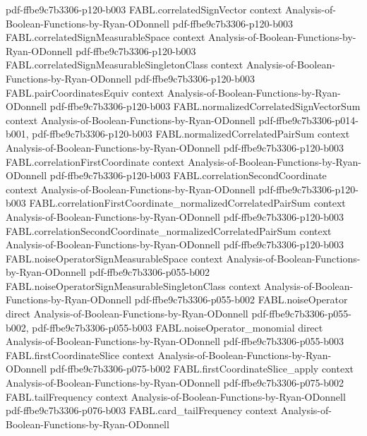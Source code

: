 \begin{theorem}
  {pdf-ffbe9c7b3306-p120-b003}
\proofstep
  {FABL.correlatedSignVector}
  {context}
  {Analysis-of-Boolean-Functions-by-Ryan-ODonnell}
  {pdf-ffbe9c7b3306-p120-b003}
\proofstep
  {FABL.correlatedSignMeasurableSpace}
  {context}
  {Analysis-of-Boolean-Functions-by-Ryan-ODonnell}
  {pdf-ffbe9c7b3306-p120-b003}
\proofstep
  {FABL.correlatedSignMeasurableSingletonClass}
  {context}
  {Analysis-of-Boolean-Functions-by-Ryan-ODonnell}
  {pdf-ffbe9c7b3306-p120-b003}
\proofstep
  {FABL.pairCoordinatesEquiv}
  {context}
  {Analysis-of-Boolean-Functions-by-Ryan-ODonnell}
  {pdf-ffbe9c7b3306-p120-b003}
\proofstep
  {FABL.normalizedCorrelatedSignVectorSum}
  {context}
  {Analysis-of-Boolean-Functions-by-Ryan-ODonnell}
  {pdf-ffbe9c7b3306-p014-b001,
    pdf-ffbe9c7b3306-p120-b003}
\proofstep
  {FABL.normalizedCorrelatedPairSum}
  {context}
  {Analysis-of-Boolean-Functions-by-Ryan-ODonnell}
  {pdf-ffbe9c7b3306-p120-b003}
\proofstep
  {FABL.correlationFirstCoordinate}
  {context}
  {Analysis-of-Boolean-Functions-by-Ryan-ODonnell}
  {pdf-ffbe9c7b3306-p120-b003}
\proofstep
  {FABL.correlationSecondCoordinate}
  {context}
  {Analysis-of-Boolean-Functions-by-Ryan-ODonnell}
  {pdf-ffbe9c7b3306-p120-b003}
\proofstep
  {FABL.correlationFirstCoordinate_normalizedCorrelatedPairSum}
  {context}
  {Analysis-of-Boolean-Functions-by-Ryan-ODonnell}
  {pdf-ffbe9c7b3306-p120-b003}
\proofstep
  {FABL.correlationSecondCoordinate_normalizedCorrelatedPairSum}
  {context}
  {Analysis-of-Boolean-Functions-by-Ryan-ODonnell}
  {pdf-ffbe9c7b3306-p120-b003}
\proofstep
  {FABL.noiseOperatorSignMeasurableSpace}
  {context}
  {Analysis-of-Boolean-Functions-by-Ryan-ODonnell}
  {pdf-ffbe9c7b3306-p055-b002}
\proofstep
  {FABL.noiseOperatorSignMeasurableSingletonClass}
  {context}
  {Analysis-of-Boolean-Functions-by-Ryan-ODonnell}
  {pdf-ffbe9c7b3306-p055-b002}
\proofstep
  {FABL.noiseOperator}
  {direct}
  {Analysis-of-Boolean-Functions-by-Ryan-ODonnell}
  {pdf-ffbe9c7b3306-p055-b002,
    pdf-ffbe9c7b3306-p055-b003}
\proofstep
  {FABL.noiseOperator_monomial}
  {direct}
  {Analysis-of-Boolean-Functions-by-Ryan-ODonnell}
  {pdf-ffbe9c7b3306-p055-b003}
\proofstep
  {FABL.firstCoordinateSlice}
  {context}
  {Analysis-of-Boolean-Functions-by-Ryan-ODonnell}
  {pdf-ffbe9c7b3306-p075-b002}
\proofstep
  {FABL.firstCoordinateSlice_apply}
  {context}
  {Analysis-of-Boolean-Functions-by-Ryan-ODonnell}
  {pdf-ffbe9c7b3306-p075-b002}
\proofstep
  {FABL.tailFrequency}
  {context}
  {Analysis-of-Boolean-Functions-by-Ryan-ODonnell}
  {pdf-ffbe9c7b3306-p076-b003}
\proofstep
  {FABL.card_tailFrequency}
  {context}
  {Analysis-of-Boolean-Functions-by-Ryan-ODonnell}

\end{theorem}
